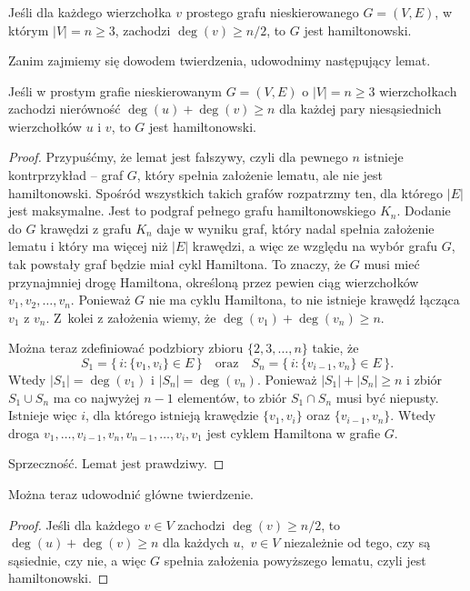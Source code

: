 \subsubsection{} %
\begin{twierdzenie*}[Dirac]
	Jeśli dla każdego wierzchołka $v$ prostego grafu nieskierowanego $G=(V,E)$, w którym $|V|=n\ge3$, zachodzi $\deg(v)\ge n/2$, to $G$ jest hamiltonowski.
\end{twierdzenie*}
Zanim zajmiemy się dowodem twierdzenia, udowodnimy następujący lemat.
\begin{lemat*}[Ore]
	Jeśli w prostym grafie nieskierowanym $G=(V,E)$ o $|V|=n\ge3$ wierzchołkach zachodzi nierówność $\deg(u)+\deg(v)\ge n$ dla każdej pary niesąsiednich wierzchołków $u$ i $v$, to $G$ jest hamiltonowski.
\end{lemat*}
\begin{proof}
Przypuśćmy, że lemat jest fałszywy, czyli dla pewnego $n$ istnieje kontrprzykład -- graf $G$, który spełnia założenie lematu, ale nie jest hamiltonowski. Spośród wszystkich takich grafów rozpatrzmy ten, dla którego $|E|$ jest maksymalne. Jest to podgraf pełnego grafu hamiltonowskiego $K_n$. Dodanie do $G$ krawędzi z grafu $K_n$ daje w wyniku graf, który nadal spełnia założenie lematu i który ma więcej niż $|E|$ krawędzi, a więc ze względu na wybór grafu $G$, tak powstały graf będzie miał cykl Hamiltona. To znaczy, że $G$ musi mieć przynajmniej drogę Hamiltona, określoną przez pewien ciąg wierzchołków $v_1,v_2,\dots,v_n$. Ponieważ $G$ nie ma cyklu Hamiltona, to nie istnieje krawędź łącząca $v_1$ z $v_n$. Z~kolei z założenia wiemy, że $\deg(v_1)+\deg(v_n)\ge n$.

Można teraz zdefiniować podzbiory zbioru $\{2,3,\dots,n\}$ takie, że
\[
	S_1 = \bigl\{\,i:\{v_1,v_i\}\in E\,\bigr\} \quad\text{oraz}\quad S_n = \bigl\{\,i:\{v_{i-1},v_n\}\in E\,\bigr\}.
\]
Wtedy $|S_1|=\deg(v_1)$ i $|S_n|=\deg(v_n)$. Ponieważ $|S_1|+|S_n|\ge n$ i zbiór $S_1\cup S_n$ ma co najwyżej $n-1$ elementów, to zbiór $S_1\cap S_n$ musi być niepusty. Istnieje więc $i$, dla którego istnieją krawędzie $\{v_1,v_i\}$ oraz $\{v_{i-1},v_n\}$. Wtedy droga $v_1,\dots,v_{i-1},v_n,v_{n-1},\dots,v_i,v_1$ jest cyklem Hamiltona w grafie $G$.

Sprzeczność. Lemat jest prawdziwy.
\end{proof}

Można teraz udowodnić główne twierdzenie.
\begin{proof}
Jeśli dla każdego $v\in V$ zachodzi $\deg(v)\ge n/2$, to $\deg(u)+\deg(v)\ge n$ dla każdych $u$,~$v\in V$ niezależnie od tego, czy są sąsiednie, czy nie, a więc $G$ spełnia założenia powyższego lematu, czyli jest hamiltonowski.
\end{proof}

